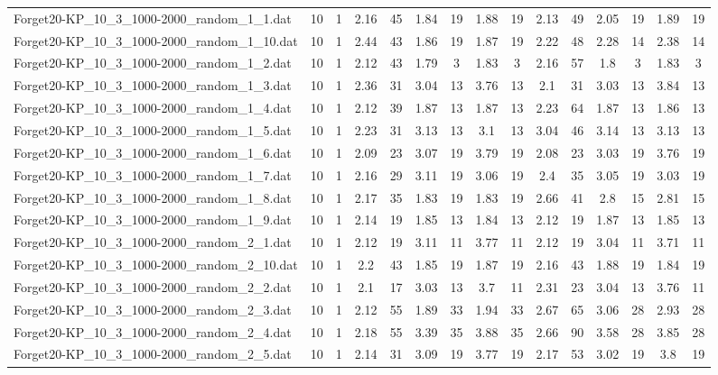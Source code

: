 \begin{table}[!ht]
{\begin{tabular}{lcccccccccccccc}
Forget20-KP\_10\_3\_1000-2000\_random\_1\_1.dat & 10 & 1 & 2.16 & 45 & 1.84 & 19 & 1.88 & 19 & 2.13 & 49 & 2.05 & 19 & 1.89 & 19 \\
Forget20-KP\_10\_3\_1000-2000\_random\_1\_10.dat & 10 & 1 & 2.44 & 43 & 1.86 & 19 & 1.87 & 19 & 2.22 & 48 & 2.28 & 14 & 2.38 & 14 \\
Forget20-KP\_10\_3\_1000-2000\_random\_1\_2.dat & 10 & 1 & 2.12 & 43 & 1.79 & 3 & 1.83 & 3 & 2.16 & 57 & 1.8 & 3 & 1.83 & 3 \\
Forget20-KP\_10\_3\_1000-2000\_random\_1\_3.dat & 10 & 1 & 2.36 & 31 & 3.04 & 13 & 3.76 & 13 & 2.1 & 31 & 3.03 & 13 & 3.84 & 13 \\
Forget20-KP\_10\_3\_1000-2000\_random\_1\_4.dat & 10 & 1 & 2.12 & 39 & 1.87 & 13 & 1.87 & 13 & 2.23 & 64 & 1.87 & 13 & 1.86 & 13 \\
Forget20-KP\_10\_3\_1000-2000\_random\_1\_5.dat & 10 & 1 & 2.23 & 31 & 3.13 & 13 & 3.1 & 13 & 3.04 & 46 & 3.14 & 13 & 3.13 & 13 \\
Forget20-KP\_10\_3\_1000-2000\_random\_1\_6.dat & 10 & 1 & 2.09 & 23 & 3.07 & 19 & 3.79 & 19 & 2.08 & 23 & 3.03 & 19 & 3.76 & 19 \\
Forget20-KP\_10\_3\_1000-2000\_random\_1\_7.dat & 10 & 1 & 2.16 & 29 & 3.11 & 19 & 3.06 & 19 & 2.4 & 35 & 3.05 & 19 & 3.03 & 19 \\
Forget20-KP\_10\_3\_1000-2000\_random\_1\_8.dat & 10 & 1 & 2.17 & 35 & 1.83 & 19 & 1.83 & 19 & 2.66 & 41 & 2.8 & 15 & 2.81 & 15 \\
Forget20-KP\_10\_3\_1000-2000\_random\_1\_9.dat & 10 & 1 & 2.14 & 19 & 1.85 & 13 & 1.84 & 13 & 2.12 & 19 & 1.87 & 13 & 1.85 & 13 \\
Forget20-KP\_10\_3\_1000-2000\_random\_2\_1.dat & 10 & 1 & 2.12 & 19 & 3.11 & 11 & 3.77 & 11 & 2.12 & 19 & 3.04 & 11 & 3.71 & 11 \\
Forget20-KP\_10\_3\_1000-2000\_random\_2\_10.dat & 10 & 1 & 2.2 & 43 & 1.85 & 19 & 1.87 & 19 & 2.16 & 43 & 1.88 & 19 & 1.84 & 19 \\
Forget20-KP\_10\_3\_1000-2000\_random\_2\_2.dat & 10 & 1 & 2.1 & 17 & 3.03 & 13 & 3.7 & 11 & 2.31 & 23 & 3.04 & 13 & 3.76 & 11 \\
Forget20-KP\_10\_3\_1000-2000\_random\_2\_3.dat & 10 & 1 & 2.12 & 55 & 1.89 & 33 & 1.94 & 33 & 2.67 & 65 & 3.06 & 28 & 2.93 & 28 \\
Forget20-KP\_10\_3\_1000-2000\_random\_2\_4.dat & 10 & 1 & 2.18 & 55 & 3.39 & 35 & 3.88 & 35 & 2.66 & 90 & 3.58 & 28 & 3.85 & 28 \\
Forget20-KP\_10\_3\_1000-2000\_random\_2\_5.dat & 10 & 1 & 2.14 & 31 & 3.09 & 19 & 3.77 & 19 & 2.17 & 53 & 3.02 & 19 & 3.8 & 19 \\

\end{tabular}}
\end{table}
